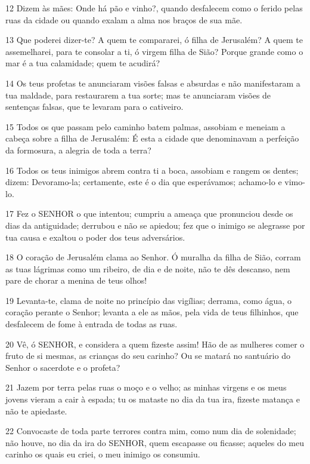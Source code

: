 \par 12 Dizem às mães: Onde há pão e vinho?, quando desfalecem como o ferido pelas ruas da cidade ou quando exalam a alma nos braços de sua mãe.
\par 13 Que poderei dizer-te? A quem te compararei, ó filha de Jerusalém? A quem te assemelharei, para te consolar a ti, ó virgem filha de Sião? Porque grande como o mar é a tua calamidade; quem te acudirá?
\par 14 Os teus profetas te anunciaram visões falsas e absurdas e não manifestaram a tua maldade, para restaurarem a tua sorte; mas te anunciaram visões de sentenças falsas, que te levaram para o cativeiro.
\par 15 Todos os que passam pelo caminho batem palmas, assobiam e meneiam a cabeça sobre a filha de Jerusalém: É esta a cidade que denominavam a perfeição da formosura, a alegria de toda a terra?
\par 16 Todos os teus inimigos abrem contra ti a boca, assobiam e rangem os dentes; dizem: Devoramo-la; certamente, este é o dia que esperávamos; achamo-lo e vimo-lo.
\par 17 Fez o SENHOR o que intentou; cumpriu a ameaça que pronunciou desde os dias da antiguidade; derrubou e não se apiedou; fez que o inimigo se alegrasse por tua causa e exaltou o poder dos teus adversários.
\par 18 O coração de Jerusalém clama ao Senhor. Ó muralha da filha de Sião, corram as tuas lágrimas como um ribeiro, de dia e de noite, não te dês descanso, nem pare de chorar a menina de teus olhos!
\par 19 Levanta-te, clama de noite no princípio das vigílias; derrama, como água, o coração perante o Senhor; levanta a ele as mãos, pela vida de teus filhinhos, que desfalecem de fome à entrada de todas as ruas.
\par 20 Vê, ó SENHOR, e considera a quem fizeste assim! Hão de as mulheres comer o fruto de si mesmas, as crianças do seu carinho? Ou se matará no santuário do Senhor o sacerdote e o profeta?
\par 21 Jazem por terra pelas ruas o moço e o velho; as minhas virgens e os meus jovens vieram a cair à espada; tu os mataste no dia da tua ira, fizeste matança e não te apiedaste.
\par 22 Convocaste de toda parte terrores contra mim, como num dia de solenidade; não houve, no dia da ira do SENHOR, quem escapasse ou ficasse; aqueles do meu carinho os quais eu criei, o meu inimigo os consumiu.


